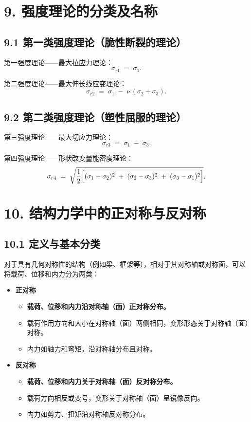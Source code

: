 \documentclass[12pt,a4paper]{article}
\begin{document}
\section*{9. 强度理论的分类及名称}

\subsection*{9.1 第一类强度理论（脆性断裂的理论）}

\noindent
第一强度理论——最大拉应力理论：
\[
  \sigma_{r1} \;=\; \sigma_1.
\]

\noindent
第二强度理论——最大伸长线应变理论：
\[
  \sigma_{r2} \;=\; \sigma_1 \;-\; \nu\,(\sigma_2 + \sigma_3).
\]

\subsection*{9.2 第二类强度理论（塑性屈服的理论）}

\noindent
第三强度理论——最大切应力理论：
\[
  \sigma_{r3} \;=\; \sigma_1 \;-\; \sigma_3.
\]

\noindent
第四强度理论——形状改变量能密度理论：
\[
  \sigma_{r4} \;=\; \sqrt{\frac{1}{2}\Bigl[(\sigma_1 - \sigma_2)^2 \;+\; (\sigma_2 - \sigma_3)^2 \;+\; (\sigma_3 - \sigma_1)^2\Bigr]}.
\]

\section*{10. 结构力学中的正对称与反对称}

\subsection*{10.1 定义与基本分类}

对于具有几何对称性的结构（例如梁、框架等），相对于其对称轴或对称面，可以将载荷、位移和内力分为两类：

\begin{itemize}
  \item \textbf{正对称}  
  \begin{itemize}
    \item \textbf{载荷、位移和内力沿对称轴（面）正对称分布。}  
    \item 载荷作用方向和大小在对称轴（面）两侧相同，变形形态关于对称轴（面）对称。  
    \item 内力如轴力和弯矩，沿对称轴分布且对称。  
  \end{itemize}

  \item \textbf{反对称}  
  \begin{itemize}
    \item \textbf{载荷、位移和内力关于对称轴（面）反对称分布。}  
    \item 载荷方向相反或变号，变形关于对称轴（面）呈镜像反向。  
    \item 内力如剪力、扭矩沿对称轴反对称分布。
  \end{itemize}
\end{itemize}
\end{document}
